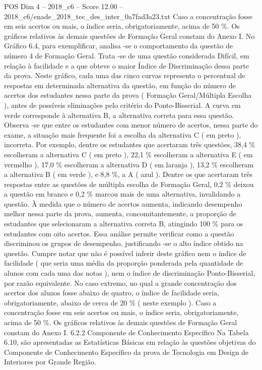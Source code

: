 \begin{textsample}{POS Dim 4 – 2018\_c6 – Score 12.00 – 2018\_c6/enade\_2018\_tec\_des\_inter\_0a7fad3a23.txt}
Caso a concentração fosse em seis acertos ou mais, o índice seria, obrigatoriamente, acima de 50 \%.
Os gráficos relativos às demais questões de Formação Geral constam do Anexo I.
No Gráfico 6.4, para exemplificar, analisa -se o comportamento da questão de número 4 de Formação Geral.
Trata -se de uma questão considerada Difícil, em relação à facilidade e a que obteve o maior Índice de Discriminação dessa parte da prova.
Neste gráfico, cada uma das cinco curvas representa o percentual de respostas em determinada alternativa da questão, em função do número de acertos dos estudantes nessa parte da prova ( Formação Geral/Múltipla Escolha ), antes de possíveis eliminações pelo critério do Ponto-Bisserial.
A curva em verde corresponde à alternativa B, a alternativa correta para essa questão.
Observa -se que entre os estudantes com menor número de acertos, nessa parte do exame, a situação mais frequente foi a escolha da alternativa C ( em preto ), incorreta.
Por exemplo, dentre os estudantes que acertaram três questões, 38,4 \% escolheram a alternativa C ( em preto ), 22,1 \% escolheram a alternativa E ( em vermelho ), 17,0 \% escolheram a alternativa D ( em laranja ), 13,2 \% escolheram a alternativa B ( em verde ), e 8,8 \%, a A ( azul ).
Dentre os que acertaram três respostas entre as questões de múltipla escolha de Formação Geral, 0,2 \% deixou a questão em branco e 0,2 \% marcou mais de uma alternativa, invalidando a questão.
À medida que o número de acertos aumenta, indicando desempenho melhor nessa parte da prova, aumenta, concomitantemente, a proporção de estudantes que selecionaram a alternativa correta B, atingindo 100 \% para os estudantes com oito acertos.
Essa análise permite verificar como a questão discriminou os grupos de desempenho, justificando -se o alto índice obtido na questão.
Cumpre notar que não é possível inferir deste gráfico nem o índice de facilidade ( que seria uma média da proporção ponderada pela quantidade de alunos com cada uma das notas ), nem o índice de discriminação Ponto-Bisserial, por razão equivalente.
No caso extremo, no qual a grande concentração dos acertos dos alunos fosse abaixo de quatro, o índice de facilidade seria, obrigatoriamente, abaixo de cerca de 20 \% ( neste exemplo ).
Caso a concentração fosse em seis acertos ou mais, o índice seria, obrigatoriamente, acima de 50 \%.
Os gráficos relativos às demais questões de Formação Geral constam do Anexo I. 6.2.2 Componente de Conhecimento Específico Na Tabela 6.10, são apresentadas as Estatísticas Básicas em relação às questões objetivas do Componente de Conhecimento Específico da prova de Tecnologia em Design de Interiores por Grande Região.

\end{textsample}

